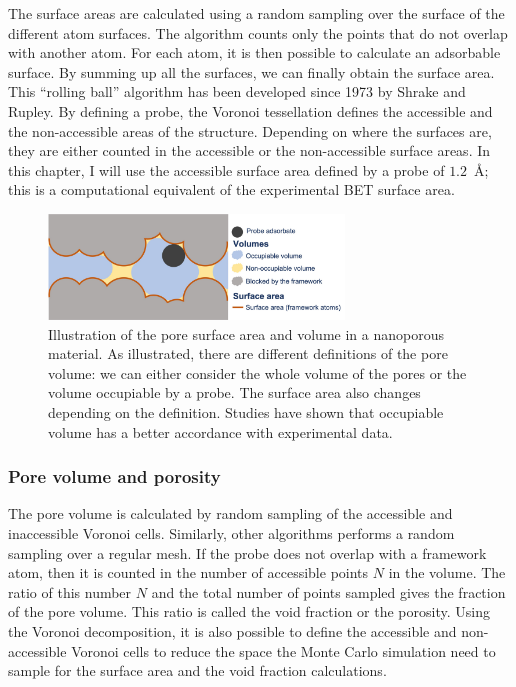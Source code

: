 \documentclass[main.tex]{subfiles}
\begin{document}
The surface areas are calculated using a random sampling over the surface of the different atom surfaces. The algorithm counts only the points that do not overlap with another atom. For each atom, it is then possible to calculate an adsorbable surface. By summing up all the surfaces, we can finally obtain the surface area. This ``rolling ball'' algorithm has been developed since 1973 by Shrake and Rupley.\autocite{Shrake1973} By defining a probe, the Voronoi tessellation defines the accessible and the non-accessible areas of the structure. Depending on where the surfaces are, they are either counted in the accessible or the non-accessible surface areas. In this chapter, I will use the accessible surface area defined by a probe of $1.2$~\si{\angstrom}; this is a computational equivalent of the experimental  BET surface area.

\begin{figure}[ht!]
  \centering
  \includegraphics[width=0.7\textwidth]{figures/1-screening/Pore_descriptors.jpg}
  \caption{Illustration of the pore surface area and volume in a nanoporous material. As illustrated, there are different definitions of the pore volume: we can either consider the whole volume of the pores or the volume occupiable by a probe. The surface area also changes depending on the definition. Studies have shown that occupiable volume has a better accordance with experimental data.\autocite{vol_Ongari2017} }\label{fgr:pores}
\end{figure}

\subsubsection{Pore volume and porosity}

The pore volume is calculated by random sampling of the accessible and inaccessible Voronoi cells. Similarly, other algorithms performs a random sampling over a regular mesh. If the probe does not overlap with a framework atom, then it is counted in the number of accessible points $N$ in the volume. The ratio of this number $N$ and the total number of points sampled gives the fraction of the pore volume. This ratio is called the void fraction or the porosity. Using the Voronoi decomposition, it is also possible to define the accessible and non-accessible Voronoi cells to reduce the space the Monte Carlo simulation need to sample for the surface area and the void fraction calculations.
\end{document}
